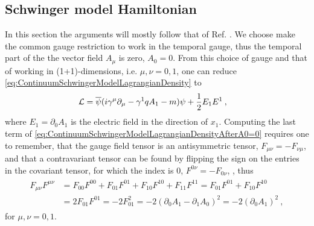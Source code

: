 \documentclass[../main.tex]{subfiles} %
\begin{document}
\subsection{Schwinger model Hamiltonian} \label{sec:ContinuumSchwingerModelHamiltonianDensity}

In this section the arguments will mostly follow that of Ref. \cite{melnikov_latticeSchwingerModel_2000}. We choose make the common gauge restriction to work in the temporal gauge, thus the temporal part of the the vector field $A_\mu$ is zero, $A_0 = 0$. From this choice of gauge and that of working in (1+1)-dimensions, i.e. $\mu,\nu = 0,1$, one can reduce \cref{eq:ContinuumSchwingerModelLagrangianDensity} to
\begin{align} \label{eq:ContinuumSchwingerModelLagrangianDensityAfterA0=0}
    \mathcal{L} &= \overline{\psi} (i \gamma^\mu \partial_\mu - \gamma^1 q A_1 - m) \psi + \frac{1}{2}E_1E^1 \: ,
\end{align}
where $E_1 = \partial_0 A_1$ is the electric field in the direction of $x_1$. Computing the last term of \cref{eq:ContinuumSchwingerModelLagrangianDensityAfterA0=0} requires one to remember, that the gauge field tensor is an antisymmetric tensor, $F_{\mu\nu} = - F_{\nu\mu}$, and that a contravariant tensor can be found by flipping the sign on the entries in the covariant tensor, for which the index is $0$, $F^{0\nu} = -F_{0\nu}$, \cite{griffiths_introToEldyn_2017}, thus
\begin{align}
\begin{split}
    F_{\mu\nu}F^{\mu\nu} &= F_{00}F^{00} + F_{01}F^{01} + F_{10}F^{10} + F_{11}F^{11}     = F_{01}F^{01} + F_{10}F^{10} \\
        &= 2F_{01}F^{01}
        = -2F_{01}^2
        = -2(\partial_0A_1 - \partial_1A_0)^2
        = -2(\partial_0A_1)^2 \: ,
\end{split}
\end{align}
for $\mu,\nu = 0,1$.
\end{document}
